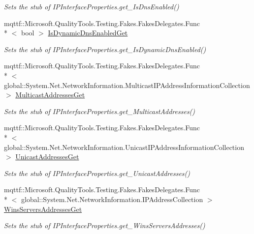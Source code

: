 \begin{DoxyCompactItemize}
\begin{DoxyCompactList}\small\item\em Sets the stub of I\-P\-Interface\-Properties.\-get\-\_\-\-Is\-Dns\-Enabled()\end{DoxyCompactList}\item 
mqttf\-::\-Microsoft.\-Quality\-Tools.\-Testing.\-Fakes.\-Fakes\-Delegates.\-Func\\*
$<$ bool $>$ \hyperlink{class_system_1_1_net_1_1_network_information_1_1_fakes_1_1_stub_i_p_interface_properties_a7438cfa37aea5d2a247ead5c18cb9f35}{Is\-Dynamic\-Dns\-Enabled\-Get}
\begin{DoxyCompactList}\small\item\em Sets the stub of I\-P\-Interface\-Properties.\-get\-\_\-\-Is\-Dynamic\-Dns\-Enabled()\end{DoxyCompactList}\item 
mqttf\-::\-Microsoft.\-Quality\-Tools.\-Testing.\-Fakes.\-Fakes\-Delegates.\-Func\\*
$<$ global\-::\-System.\-Net.\-Network\-Information.\-Multicast\-I\-P\-Address\-Information\-Collection $>$ \hyperlink{class_system_1_1_net_1_1_network_information_1_1_fakes_1_1_stub_i_p_interface_properties_af5819a07df6522dc9fac5e0f7938f47f}{Multicast\-Addresses\-Get}
\begin{DoxyCompactList}\small\item\em Sets the stub of I\-P\-Interface\-Properties.\-get\-\_\-\-Multicast\-Addresses()\end{DoxyCompactList}\item 
mqttf\-::\-Microsoft.\-Quality\-Tools.\-Testing.\-Fakes.\-Fakes\-Delegates.\-Func\\*
$<$ global\-::\-System.\-Net.\-Network\-Information.\-Unicast\-I\-P\-Address\-Information\-Collection $>$ \hyperlink{class_system_1_1_net_1_1_network_information_1_1_fakes_1_1_stub_i_p_interface_properties_a42cdbf1cb277328f4eaa23c100af615c}{Unicast\-Addresses\-Get}
\begin{DoxyCompactList}\small\item\em Sets the stub of I\-P\-Interface\-Properties.\-get\-\_\-\-Unicast\-Addresses()\end{DoxyCompactList}\item 
mqttf\-::\-Microsoft.\-Quality\-Tools.\-Testing.\-Fakes.\-Fakes\-Delegates.\-Func\\*
$<$ global\-::\-System.\-Net.\-Network\-Information.\-I\-P\-Address\-Collection $>$ \hyperlink{class_system_1_1_net_1_1_network_information_1_1_fakes_1_1_stub_i_p_interface_properties_a89b48d119a965d822ac13630ecb929cb}{Wins\-Servers\-Addresses\-Get}
\begin{DoxyCompactList}\small\item\em Sets the stub of I\-P\-Interface\-Properties.\-get\-\_\-\-Wins\-Servers\-Addresses()\end{DoxyCompactList}\end{DoxyCompactItemize}
